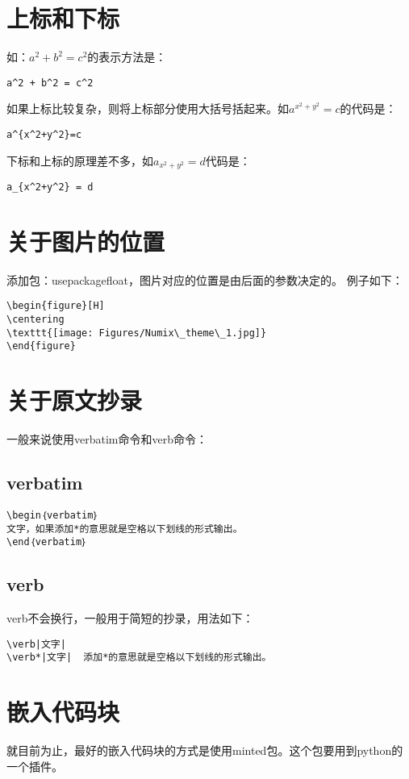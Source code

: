 \documentclass[a4paper,12pt]{ctexbook}
\begin{document}
\begin{flushleft}
\section{上标和下标}
\label{superscript}
如：$a^2 + b^2 = c^2$的表示方法是：
\begin{verbatim}
a^2 + b^2 = c^2
\end{verbatim}
如果上标比较复杂，则将上标部分使用大括号括起来。如$a^{x^2+y^2}=c$的代码是：
\begin{verbatim}
a^{x^2+y^2}=c
\end{verbatim}
下标和上标的原理差不多，如$a_{x^2+y^2} = d$代码是：
\begin{verbatim}
a_{x^2+y^2} = d
\end{verbatim}

\section{关于图片的位置}
\label{picture_position}
添加包：usepackage{float}，图片对应的位置是由后面的参数决定的。
例子如下：
\begin{verbatim}
\begin{figure}[H]
\centering
\texttt{[image: Figures/Numix\_theme\_1.jpg]}
\end{figure}
\end{verbatim}

\section{关于原文抄录}
\label{verbatim}
一般来说使用verbatim命令和verb命令：
\subsection{verbatim}
\begin{verbatim}
\begin｛verbatim｝
文字，如果添加*的意思就是空格以下划线的形式输出。
\end｛verbatim｝
\end{verbatim}
\subsection{verb}
verb不会换行，一般用于简短的抄录，用法如下：
\begin{verbatim}
\verb|文字|
\verb*|文字|  添加*的意思就是空格以下划线的形式输出。
\end{verbatim}

\section{嵌入代码块}
就目前为止，最好的嵌入代码块的方式是使用minted包。这个包要用到python的一个插件。

\end{flushleft}
\end{document}
